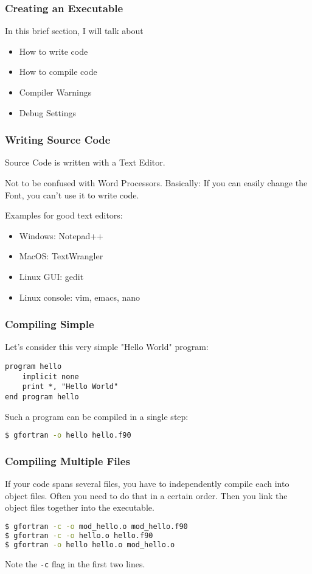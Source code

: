 \begin{frame}
  \frametitle{Creating an Executable}

  In this brief section, I will talk about
  \begin{itemize}
    \item How to write code
    \item How to compile code
    \item Compiler Warnings
    \item Debug Settings
  \end{itemize}
\end{frame}

\begin{frame}
  \frametitle{Writing Source Code}
  Source Code is written with a Text Editor.

  Not to be confused with Word Processors. 
  Basically: If you can easily change the Font, you can't use it to write code.

  Examples for good text editors:

  \begin{itemize}
    \item Windows: Notepad++
    \item MacOS: TextWrangler
    \item Linux GUI: gedit
    \item Linux console: vim, emacs, nano
  \end{itemize}
\end{frame}

\begin{frame}[fragile]
  \frametitle{Compiling Simple}
  Let's consider this very simple "Hello World" program:
  \begin{lstlisting}
program hello
    implicit none
    print *, "Hello World"
end program hello
  \end{lstlisting}
  Such a program can be compiled in a single step:
  \begin{lstlisting}[language=bash,numbers=none]
$ gfortran -o hello hello.f90
  \end{lstlisting}
\end{frame}

\begin{frame}[fragile]
  \frametitle{Compiling Multiple Files}
  If your code spans several files, you have to independently compile each into
  object files. Often you need to do that in a certain order.
  Then you link the object files together into the executable.

  \begin{lstlisting}[language=bash,numbers=none]
$ gfortran -c -o mod_hello.o mod_hello.f90
$ gfortran -c -o hello.o hello.f90
$ gfortran -o hello hello.o mod_hello.o
  \end{lstlisting}

  Note the \texttt{-c} flag in the first two lines.
\end{frame}

